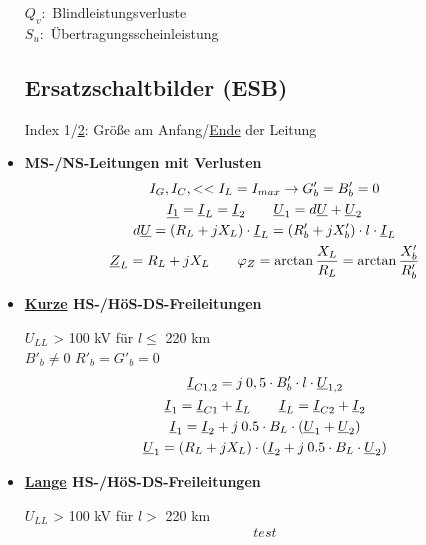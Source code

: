 \begin{itemize}
        \indent $Q_v:$ Blindleistungsverluste\\
        \indent $S_u:$ Übertragungsscheinleistung

\subsection{Ersatzschaltbilder (ESB)}

Index 1/\ul{2}: Größe am Anfang/\ul{Ende} der Leitung\\

\item[] \textbf{MS-/NS-Leitungen mit Verlusten}
        \begin{gather*}
            I_G, I_C, << I_L = I_{max} \rightarrow G'_b = B'_b = 0\\
            \underline{I_1} = \underline{I}_L = \underline{I}_2 \qquad
            \underline{U}_1 = d \underline{U} + \underline{U}_2\\
            d \underline{U} = (R_L + jX_L) \cdot \underline{I}_L = (R'_b +jX'_b) \cdot l \cdot \underline{I}_L\\
            \underline{Z}_L = R_L +jX_L \qquad \varphi_Z =\arctan \frac{X_L}{R_L} = \arctan \frac{X'_b}{R'_b}
        \end{gather*}

\item[] \textbf{\ul{Kurze} HS-/HöS-DS-Freileitungen}

    $U_{LL}$ > 100 kV für $l\leq$ 220 km\\
    $B'_b \neq 0 $ \qquad $R'_b = G'_b = 0$
    \begin{gather*}
        \underline{I}_{C1,2} = j \: 0,5 \cdot B'_b \cdot l \cdot \underline{U}_{1,2}\\
        \underline{I}_1 = \underline{I}_{C1} + \underline{I}_L \qquad  \underline{I}_L =  \underline{I}_{C2} +  \underline{I}_2\\
        \underline{I}_1 =  \underline{I}_2 + j \: 0.5 \cdot B_L \cdot ( \underline{U}_1 + \underline{U}_2)\\
         \underline{U}_1 = (R_L + jX_L)\cdot (\underline{I}_2 + j \: 0.5 \cdot B_L \cdot \underline{U}_2)
    \end{gather*}

\item[] \textbf{\ul{Lange} HS-/HöS-DS-Freileitungen}

    $U_{LL}$ > 100 kV für $l>$ 220 km\\
    \begin{gather*}
        test
    \end{gather*}

\end{itemize}
